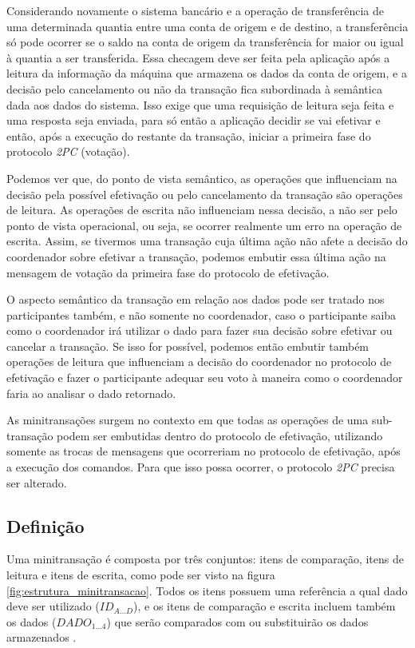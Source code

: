 \documentclass[11pt,twoside,a4paper]{book}
\begin{document}
Considerando novamente o sistema bancário e a operação de transferência de uma determinada quantia entre uma conta de origem e de destino, a transferência só pode ocorrer se o saldo na conta de origem da transferência for maior ou igual à quantia a ser transferida. Essa checagem deve ser feita pela aplicação após a leitura da informação da máquina que armazena os dados da conta de origem, e a decisão pelo cancelamento ou não da transação fica subordinada à semântica dada aos dados do sistema. Isso exige que uma requisição de leitura seja feita e uma resposta seja enviada, para só então a aplicação decidir se vai efetivar e então, após a execução do restante da transação, iniciar a primeira fase do protocolo \emph{2PC} (votação).

Podemos ver que, do ponto de vista semântico, as operações que influenciam na decisão pela possível efetivação ou pelo cancelamento da transação são operações de leitura. As operações de escrita não influenciam nessa decisão, a não ser pelo ponto de vista operacional, ou seja, se ocorrer realmente um erro na operação de escrita. Assim, se tivermos uma transação cuja última ação não afete a decisão do coordenador sobre efetivar a transação, podemos embutir essa última ação na mensagem de votação da primeira fase do protocolo de efetivação.

O aspecto semântico da transação em relação aos dados pode ser tratado nos participantes também, e não somente no coordenador, caso o participante saiba como o coordenador irá utilizar o dado para fazer sua decisão sobre efetivar ou cancelar a transação. Se isso for possível, podemos então embutir também operações de leitura que influenciam a decisão do coordenador no protocolo de efetivação e fazer o participante adequar seu voto à maneira como o coordenador faria ao analisar o dado retornado.

As minitransações surgem no contexto em que todas as operações de uma sub-transação podem ser embutidas dentro do protocolo de efetivação, utilizando somente as trocas de mensagens que ocorreriam no protocolo de efetivação, após a execução dos comandos. Para que isso possa ocorrer, o protocolo \emph{2PC} precisa ser alterado.

\subsection{Definição}
\label{subsec:estrutura-minitransacoes}
Uma minitransação é composta por três conjuntos: itens de comparação, itens de leitura e itens de escrita, como pode ser visto na figura \ref{fig:estrutura_minitransacao}. Todos os itens possuem uma referência a qual dado deve ser utilizado ($ID_{A...D}$), e os itens de comparação e escrita incluem também os dados ($DADO_{1...4}$) que serão comparados com ou substituirão os dados armazenados \cite{sinfonia}. 
\end{document}
